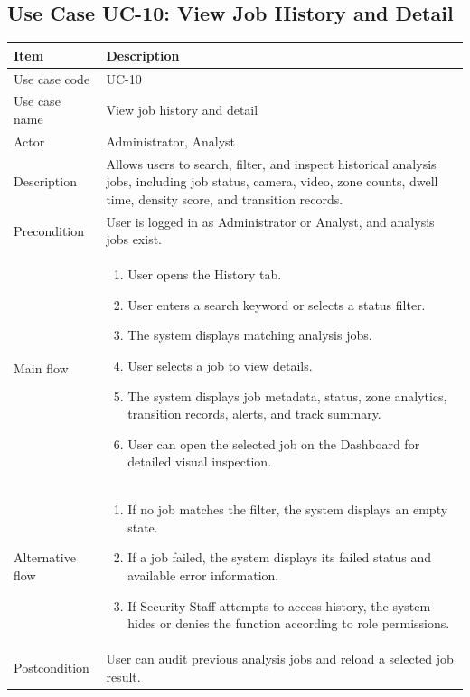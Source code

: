 \documentclass[12pt,a4paper]{report}
\begin{document}
\subsection{Use Case UC-10: View Job History and Detail}
\begin{longtable}{|p{3.6cm}|p{10.4cm}|}
\hline
\rowcolor{HeaderBlue}\textbf{Item} & \textbf{Description} \\
\hline
Use case code & UC-10 \\
\hline
Use case name & View job history and detail \\
\hline
Actor & Administrator, Analyst \\
\hline
Description & Allows users to search, filter, and inspect historical analysis jobs, including job status, camera, video, zone counts, dwell time, density score, and transition records. \\
\hline
Precondition & User is logged in as Administrator or Analyst, and analysis jobs exist. \\
\hline
Main flow &
\begin{enumerate}
    \item User opens the History tab.
    \item User enters a search keyword or selects a status filter.
    \item The system displays matching analysis jobs.
    \item User selects a job to view details.
    \item The system displays job metadata, status, zone analytics, transition records, alerts, and track summary.
    \item User can open the selected job on the Dashboard for detailed visual inspection.
\end{enumerate} \\
\hline
Alternative flow &
\begin{enumerate}
    \item If no job matches the filter, the system displays an empty state.
    \item If a job failed, the system displays its failed status and available error information.
    \item If Security Staff attempts to access history, the system hides or denies the function according to role permissions.
\end{enumerate} \\
\hline
Postcondition & User can audit previous analysis jobs and reload a selected job result. \\
\hline
\end{longtable}
\end{document}
